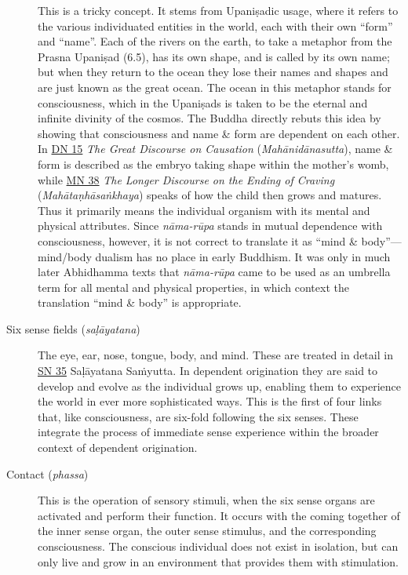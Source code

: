 \documentclass[12pt,openany]{book}%
\begin{document}
\begin{description}
This is a tricky concept. It stems from \textsanskrit{Upaniṣadic} usage, where it refers to the various individuated entities in the world, each with their own “form” and “name”. Each of the rivers on the earth, to take a metaphor from the Prasna \textsanskrit{Upaniṣad} (6.5), has its own shape, and is called by its own name; but when they return to the ocean they lose their names and shapes and are just known as the great ocean. The ocean in this metaphor stands for consciousness, which in the \textsanskrit{Upaniṣads} is taken to be the eternal and infinite divinity of the cosmos. The Buddha directly rebuts this idea by showing that consciousness and name \& form are dependent on each other. In \href{https://suttacentral.net/dn15}{DN 15} \textit{The Great Discourse on Causation} (\textit{\textsanskrit{Mahānidānasutta}}), name \& form is described as the embryo taking shape within the mother’s womb, while \href{https://suttacentral.net/mn38}{MN 38} \textit{The Longer Discourse on the Ending of Craving} (\textit{\textsanskrit{Mahātaṇhāsaṅkhaya}}) speaks of how the child then grows and matures. Thus it primarily means the individual organism with its mental and physical attributes. Since \textit{\textsanskrit{nāma}-\textsanskrit{rūpa}} stands in mutual dependence with consciousness, however, it is not correct to translate it as “mind \& body”—mind/body dualism has no place in early Buddhism. It was only in much later Abhidhamma texts that \textit{\textsanskrit{nāma}-\textsanskrit{rūpa}} came to be used as an umbrella term for all mental and physical properties, in which context the translation “mind \& body” is appropriate.%
\item[Six sense fields (\textit{\textsanskrit{saḷāyatana}})] The eye, ear, nose, tongue, body, and mind.
These are treated in detail in \href{https://suttacentral.net/sn35}{SN 35} \textsanskrit{Saḷāyatana} \textsanskrit{Saṁyutta}. In dependent origination they are said to develop and evolve as the individual grows up, enabling them to experience the world in ever more sophisticated ways. This is the first of four links that, like consciousness, are six-fold following the six senses. These integrate the process of immediate sense experience within the broader context of dependent origination.%
\item[Contact (\textit{phassa})] This is the operation of sensory stimuli, when the six sense organs are activated and perform their function. It occurs with the coming together of the inner sense organ, the outer sense stimulus, and the corresponding consciousness.
The conscious individual does not exist in isolation, but can only live and grow in an environment that provides them with stimulation.%

\end{description}
\end{document}
